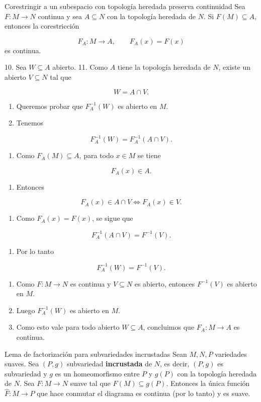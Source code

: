 \begin{bookproposition}{Corestringir a un subespacio con topología heredada preserva continuidad}
Sea $F:M\to N$ continua y sea $A\subseteq N$ con la topología heredada de $N$. Si $F(M)\subseteq A$, entonces la corestricción

\[
F_A:M\to A,\qquad F_A(x)=F(x)
\]
es continua.

\end{bookproposition}
\begin{bookproof}{}
10. Sea $W\subseteq A$ abierto. 11. Como $A$ tiene la topología heredada de $N$, existe un abierto $V\subseteq N$ tal que

\[
W=A\cap V.
\]
\begin{enumerate}[start=12]
\item Queremos probar que $F_A^{-1}(W)$ es abierto en $M$.
\item Tenemos
\end{enumerate}
\[
F_A^{-1}(W)=F_A^{-1}(A\cap V).
\]
\begin{enumerate}[start=14]
\item Como $F_A(M)\subseteq A$, para todo $x\in M$ se tiene
\end{enumerate}
\[
F_A(x)\in A.
\]
\begin{enumerate}[start=15]
\item Entonces
\end{enumerate}
\[
F_A(x)\in A\cap V \iff F_A(x)\in V.
\]
\begin{enumerate}[start=16]
\item Como $F_A(x)=F(x)$, se sigue que
\end{enumerate}
\[
F_A^{-1}(A\cap V)=F^{-1}(V).
\]
\begin{enumerate}[start=17]
\item Por lo tanto
\end{enumerate}
\[
F_A^{-1}(W)=F^{-1}(V).
\]
\begin{enumerate}[start=18]
\item Como $F:M\to N$ es continua y $V\subseteq N$ es abierto, entonces $F^{-1}(V)$ es abierto en $M$.
\item Luego $F_A^{-1}(W)$ es abierto en $M$.
\item Como esto vale para todo abierto $W\subseteq A$, concluimos que $F_A:M\to A$ es continua.
\end{enumerate}
\bookqed
\end{bookproof}
\begin{bookcorollary}{Lema de factorización para subvariedades incrustadas}
Sean $M,N,P$ variedades suaves. Sea $(P,g)$ subvariedad \textbf{incrustada} de $N$, es decir, $(P,g)$ es subvariedad y $g$ es un homeomorfismo entre $P$ y $g(P)$ con la topología heredada de $N$. Sea $F:M\to N$ suave tal que $F(M)\subseteq g(P)$. Entonces la única función $\widehat F:M\to P$ que hace conmutar el diagrama 
 es continua (por lo tanto) y es suave.

\end{bookcorollary}

